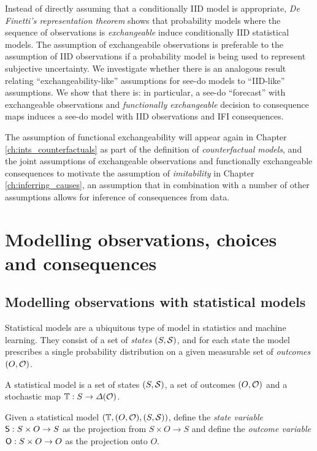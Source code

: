 Instead of directly assuming that a conditionally IID model is appropriate, \emph{De Finetti's representation theorem} shows that probability models where the sequence of observations is \emph{exchangeable} induce conditionally IID statistical models. The assumption of exchangeabile observations is preferable to the assumption of IID observations if a probability model is being used to represent subjective uncertainty. We investigate whether there is an analogous result relating ``exchangeability-like'' assumptions for see-do models to ``IID-like'' assumptions. We show that there is: in particular, a see-do ``forecast'' with exchangeable observations and \emph{functionally exchangeable} decision to consequence maps induces a see-do model with IID observations and IFI consequences.

The assumption of functional exchangeability will appear again in Chapter \ref{ch:ints_counterfactuals} as part of the definition of \emph{counterfactual models}, and the joint assumptions of exchangeable observations and functionally exchangeable consequences to motivate the assumption of \emph{imitability} in Chapter \ref{ch:inferring_causes}, an assumption that in combination with a number of other assumptions allows for inference of consequences from data.

\section{Modelling observations, choices and consequences}

\subsection{Modelling observations with statistical models}

Statistical models are a ubiquitous type of model in statistics and machine learning. They consist of a set of \emph{states} $(S,\mathcal{S})$, and for each state the model prescribes a single probability distribution on a given measurable set of \emph{outcomes} $(O,\mathcal{O})$.

\begin{definition}\label{def:statistical model}
A statistical model is a set of states $(S,\mathcal{S})$, a set of outcomes $(O,\mathcal{O})$ and a stochastic map $\mathbb{T}:S\to \Delta(\mathcal{O})$.
\end{definition}

\begin{definition}\label{def:state_outcome}
Given a statistical model $(\mathbb{T},(O,\mathcal{O}),(S,\mathcal{S}))$, define the \emph{state variable} $\mathsf{S}:S\times O\to S$ as the projection from $S\times O\to S$ and define the \emph{outcome variable} $\mathsf{O}:S\times O\to O$ as the projection onto $O$.
\end{definition}

